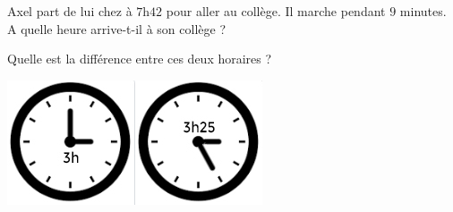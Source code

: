 \begin{pageParcoursu}
 
 Axel part de lui chez à $7$h$42$ pour aller au collège. Il marche pendant $9$ minutes. A quelle heure arrive-t-il à son collège ?



\begin{minipage}{0.60\linewidth} 
 Quelle est la différence entre ces deux horaires ?
\end{minipage}
\hfill 
\begin{minipage}{0.40\linewidth}
 \includegraphics[scale=1]{FIG/grandeurs_mesures/heure_delta.jpg} 
\end{minipage}



\end{pageParcoursu}


